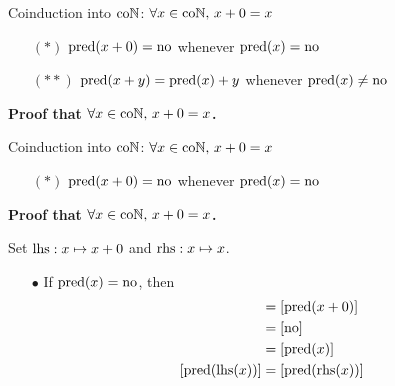 
\renewcommand{\currentGoal}{$\forall x \in \coN,\, x + 0 = x$}

\begin{frame}[t]{Coinduction into $\mathrm{co}\mathbb{N}$: \currentGoal} %
  \simpleCoindNBlock

  \begin{itemize}
    \item[$(*)$] {
      $\operatorname{pred}(x + 0) = \mathrm{no}$ whenever $\operatorname{pred}(x) = \mathrm{no}$
    }
    \item[$(**)$] {
      $\operatorname{pred}(x + y) = \operatorname{pred}(x) + y$ whenever $\operatorname{pred}(x) \neq \mathrm{no}$
    }
  \end{itemize}

  \vspace{0.5\baselineskip}

  \par\textbf{Proof that \currentGoal.}
  
\end{frame}

\begin{frame}[t]{Coinduction into $\mathrm{co}\mathbb{N}$: \currentGoal} %
  \simpleCoindNBlock

  \begin{itemize}
    \item[$(*)$] {
      $\operatorname{pred}(x + 0) = \mathrm{no}$ whenever $\operatorname{pred}(x) = \mathrm{no}$
    }
  \end{itemize}

  \vspace{0.5 \baselineskip}

  \par\textbf{Proof that \currentGoal.}
  \par Set $\mathrm{lhs} : x \mapsto x + 0$ and $\mathrm{rhs} : x \mapsto x$.
  \pause
  \begin{itemize}[]
    \item[$\bullet$] {
      If $\operatorname{pred}(x) = \mathrm{no}$, then
      \begin{align*}
        [\pred(\lhs(x))]
        &= [\pred(x + 0)]
        \\
        &= [\no]
        \\
        &= [\pred(x)]
        \\
        [\pred(\lhs(x))]
        &= [\pred(\rhs(x))]
      \end{align*}
    }
  \end{itemize}
  
\end{frame}

